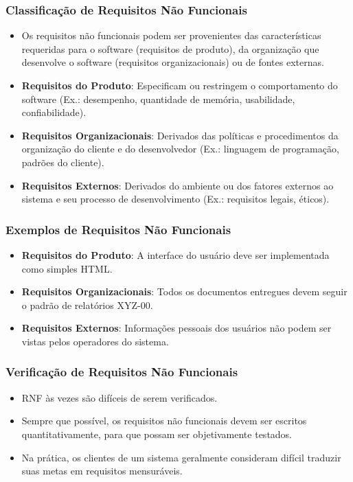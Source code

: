 \documentclass[a4paper, 11pt]{article}
\begin{document}
\subsubsection{Classificação de Requisitos Não Funcionais}
\begin{itemize}
	\item Os requisitos não funcionais podem ser provenientes das características requeridas para o software (requisitos de produto),
	da organização que desenvolve o software (requisitos organizacionais) ou de fontes externas.
	\item \textbf{Requisitos do Produto}: Especificam ou restringem o comportamento do software (Ex.: desempenho, quantidade de memória, usabilidade, confiabilidade).
	\item \textbf{Requisitos Organizacionais}: Derivados das políticas e procedimentos da organização do cliente e do desenvolvedor 
	(Ex.: linguagem de programação, padrões do cliente).
	\item \textbf{Requisitos Externos}: Derivados do ambiente ou dos fatores externos ao sistema e seu processo de desenvolvimento (Ex.: requisitos legais, éticos).
\end{itemize}

\subsubsection{Exemplos de Requisitos Não Funcionais}
\begin{itemize}
	\item \textbf{Requisitos do Produto}: A interface do usuário deve ser implementada como simples HTML.
	\item \textbf{Requisitos Organizacionais}: Todos os documentos entregues devem seguir o padrão de relatórios XYZ-00.
	\item \textbf{Requisitos Externos}: Informações pessoais dos usuários não podem ser vistas pelos operadores do sistema.
\end{itemize}



\subsubsection{Verificação de Requisitos Não Funcionais}
\begin{itemize}
	\item RNF às vezes são difíceis de serem verificados.
	\item Sempre que possível, os requisitos não funcionais devem ser escritos quantitativamente, para que possam ser objetivamente testados.
	\item Na prática, os clientes de um sistema geralmente consideram difícil traduzir suas metas em requisitos mensuráveis.
\end{itemize}
\end{document}
